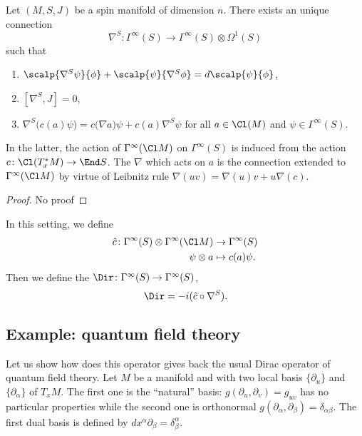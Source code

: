 \begin{theorem}
	Let $(M,S,J)$ be a spin manifold of dimension $n$. There exists an unique connection
	\[
		\nabla^S\colon \Gamma^{\infty}(S)\to \Gamma^{\infty}(S)\otimes\Omega^1(S)
	\]
	such that
	\begin{enumerate}
		\item $\scalp{ \nabla^S\psi }{ \phi }+\scalp{ \psi }{ \nabla^S\phi }=d\scalp{ \psi }{ \phi }$,
		\item $[\nabla^S,J]=0$,
		\item $\nabla^S\big( c(a)\psi \big)=c\big( \nabla a \big)\psi+c(a)\nabla^S\psi$ for all $a\in\Cl(M)$ and $\psi\in\Gamma^{\infty}(S)$.
	\end{enumerate}
	In the latter, the action of $\Gamma^{\infty}(\Cl M)$ on $\Gamma^{\infty}(S)$ is induced from the action $c\colon \Cl(T^*_xM)\to \End S$. The $\nabla$ which acts on $a$ is the connection extended to $\Gamma^{\infty}(\Cl M)$ by virtue of Leibnitz rule $\nabla(uv)=\nabla(u)v+u\nabla(c)$.

\end{theorem}

\begin{proof}
	No proof
\end{proof}


In this setting, we define
\begin{equation}
	\begin{aligned}
		\hat c\colon\Gamma^{\infty}(S)\otimes\Gamma^{\infty}(\Cl M) & \to \Gamma^{\infty}(S) \\
		\psi\otimes a                                               & \mapsto c(a)\psi.
	\end{aligned}
\end{equation}
Then we define the  $\Dir\colon \Gamma^{\infty}(S)\to \Gamma^{\infty}(S)$,
\begin{equation}
	\Dir=-i(\hat c\circ\nabla^S).
\end{equation}

\subsection{Example: quantum field theory}

Let us show how does this operator gives back the usual Dirac operator of quantum field theory. Let $M$ be a manifold and with two local basis $\{ \partial_u \}$ and $\{ \partial_{\alpha} \}$ of $T_xM$. The first one is the ``natural'' basis: $g(\partial_u,\partial_v)=g_{uv}$ has no particular properties while the second one is orthonormal $g(\partial_{\alpha},\partial_{\beta})=\delta_{\alpha\beta}$. The first dual basis is defined by $dx^{\alpha}\partial_{\beta}=\delta^{\alpha}_{\beta}$.

